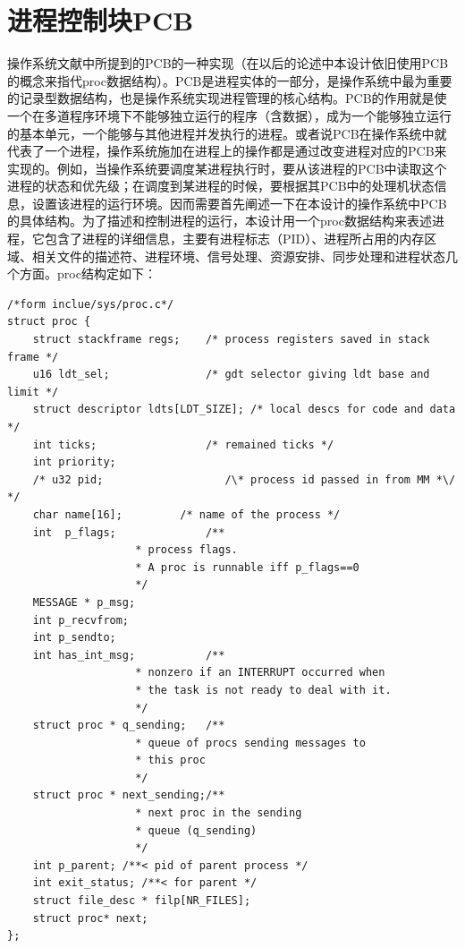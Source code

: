 \documentclass[UTF8,nofonts,cs4size]{ctexrep}
\begin{document}
\section{进程控制块PCB}
操作系统文献中所提到的PCB的一种实现（在以后的论述中本设计依旧使用PCB的概念来指代proc数据结构）。PCB是进程实体的一部分，是操作系统中最为重要的记录型数据结构，也是操作系统实现进程管理的核心结构。PCB的作用就是使一个在多道程序环境下不能够独立运行的程序（含数据），成为一个能够独立运行的基本单元，一个能够与其他进程并发执行的进程。或者说PCB在操作系统中就代表了一个进程，操作系统施加在进程上的操作都是通过改变进程对应的PCB来实现的。例如，当操作系统要调度某进程执行时，要从该进程的PCB中读取这个进程的状态和优先级；在调度到某进程的时候，要根据其PCB中的处理机状态信息，设置该进程的运行环境。因而需要首先阐述一下在本设计的操作系统中PCB的具体结构。为了描述和控制进程的运行，本设计用一个proc数据结构来表述进程，它包含了进程的详细信息，主要有进程标志（PID）、进程所占用的内存区域、相关文件的描述符、进程环境、信号处理、资源安排、同步处理和进程状态几个方面。proc结构定如下：
\begin{lstlisting}
/*form inclue/sys/proc.c*/
struct proc {
	struct stackframe regs;    /* process registers saved in stack frame */
	u16 ldt_sel;               /* gdt selector giving ldt base and limit */
	struct descriptor ldts[LDT_SIZE]; /* local descs for code and data */
    int ticks;                 /* remained ticks */
    int priority;
	/* u32 pid;                   /\* process id passed in from MM *\/ */
	char name[16];		   /* name of the process */
	int  p_flags;              /**
				    * process flags.
				    * A proc is runnable iff p_flags==0
				    */
	MESSAGE * p_msg;
	int p_recvfrom;
	int p_sendto;
	int has_int_msg;           /**
				    * nonzero if an INTERRUPT occurred when
				    * the task is not ready to deal with it.
				    */
	struct proc * q_sending;   /**
				    * queue of procs sending messages to
				    * this proc
				    */
	struct proc * next_sending;/**
				    * next proc in the sending
				    * queue (q_sending)
				    */
	int p_parent; /**< pid of parent process */
	int exit_status; /**< for parent */
	struct file_desc * filp[NR_FILES];
	struct proc* next;
};
\end{lstlisting}
\end{document}
